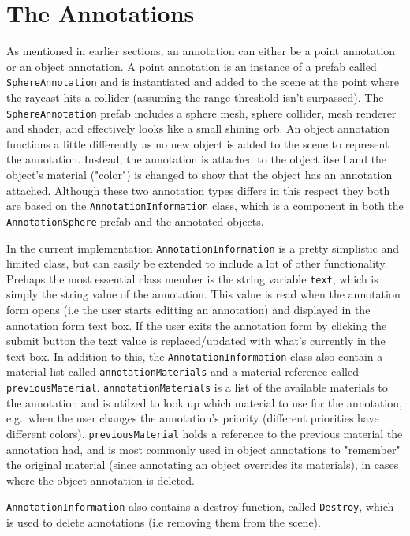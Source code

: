 \section{The Annotations}
As mentioned in earlier sections, an annotation can either be a point annotation or an object annotation. A point annotation is an instance of a prefab 
called \texttt{SphereAnnotation} and is instantiated and added to the scene at the point where the raycast hits a collider (assuming the range threshold isn't surpassed).  
The \texttt{SphereAnnotation} prefab includes a sphere mesh, sphere collider, mesh renderer and shader, and effectively looks like a small shining orb.
An object annotation functions a little differently as no new object is added to the scene to represent the annotation. Instead, the annotation is attached to the 
object itself and the object's material ("color") is changed to show that the object has an annotation attached. Although these two annotation types differs in this respect 
they both are based on the \texttt{AnnotationInformation} class, which is a component in both the \texttt{AnnotationSphere} prefab and the annotated objects. 

In the current implementation \texttt{AnnotationInformation} is a pretty simplistic and limited class, but can easily be extended to include a lot of other functionality. 
Prehaps the most essential class member is the string variable \texttt{text}, which is simply the string value of the annotation.
This value is read when the annotation form opens (i.e the user starts editting an annotation) and displayed in the annotation form text box. 
If the user exits the annotation form by clicking the submit button the text value is replaced/updated with what's currently in the text box. 
In addition to this, the \texttt{AnnotationInformation} class also contain a material-list called \texttt{annotationMaterials} and a material reference called
\texttt{previousMaterial}. \texttt{annotationMaterials} is a list of the available materials to the annotation and is utilzed to look up which material to use for the annotation, 
e.g.~when the user changes the annotation's priority (different priorities have different colors). 
\texttt{previousMaterial} holds a reference to the previous material the annotation had, and is most commonly used in object annotations to "remember" the original material 
(since annotating an object overrides its materials), in cases where the object annotation is deleted.  

\texttt{AnnotationInformation} also contains a destroy function, called \texttt{Destroy}, which is used to delete annotations (i.e removing them from the scene).

